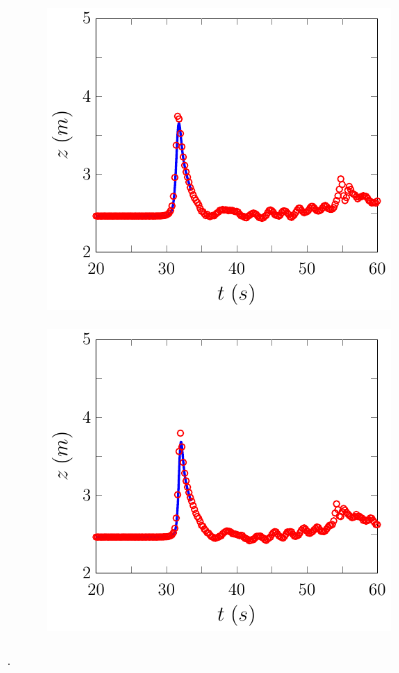 \begin{figure}
\begin{subfigure}{0.5\textwidth}
		\vspace{0.5cm}
	\end{subfigure}
	\begin{subfigure}{0.5\textwidth}
		\includegraphics[width=\textwidth]{./chp6/figures/Experiment/Roeber/Trial8/FDVM/WG5-figure0.pdf}
		\vspace{0.5cm}
	\end{subfigure}%
	\begin{subfigure}{0.5\textwidth}
		\includegraphics[width=\textwidth]{./chp6/figures/Experiment/Roeber/Trial8/FDVM/WG6-figure0.pdf}
		\vspace{0.5cm}
	\end{subfigure}
	\caption{.}
	\label{fig:Roeber8WG1to6DEVM}
\end{figure}

